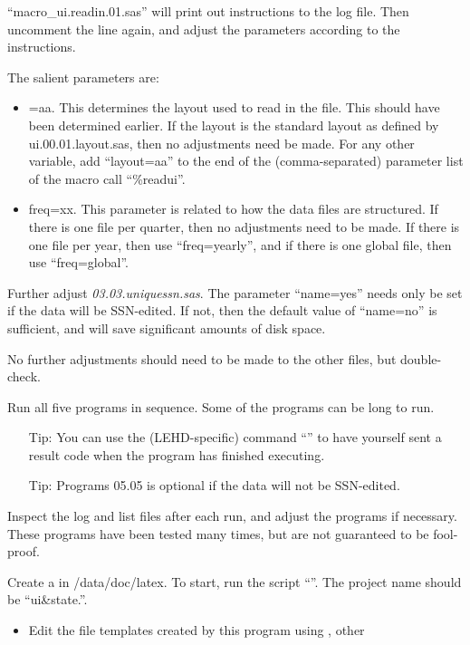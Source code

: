 \begin{description}
\begin{steps}
\begin{itemize}
    ``macro\_ui.readin.01.sas'' will print out instructions to the log
    file. Then uncomment the line again, and adjust the parameters
    according to the instructions.
\end{itemize}
The salient parameters are:
  \begin{itemize}
  \item {}=aa. This determines the layout used to read in the
    file. This should have been determined earlier. If the layout is the
    standard layout as defined by ui.00.01.layout.sas, then no adjustments
    need be made. For any other variable, add ``layout=aa'' to the end of
    the (comma-separated) parameter list of the macro call ``\%readui''.
  \item freq=xx. This parameter is related to how the data files are
    structured. If there is one file per quarter, then no adjustments need
    to be made. If there is one file per year, then use ``freq=yearly'',
    and if there is one global file, then use ``freq=global''.
  \end{itemize}
\item Further adjust \textit{03.03.uniquessn.sas}. The parameter
  ``name=yes'' needs only be set if the data will be SSN-edited. If not,
  then the default value of ``name=no'' is sufficient, and will save
  significant amounts of disk space.
\item No further adjustments should need to be made to the other 
  files, but double-check.
\item Run all five programs in sequence. Some of the programs can be long
  to run. 
  \begin{itemize}
  \item[Tip:] You can use the (LEHD-specific) command ``''
    to have yourself sent a result code when the program has finished
    executing.
  \item[Tip:] Programs 05.05 is optional if the data will not be SSN-edited.
  \end{itemize}
\item Inspect the log and list files after each run, and adjust the
  programs if necessary. These programs have been tested many times, but
  are not guaranteed to be fool-proof.
\item Create a  in /data/doc/latex. To start, run the
  script ``''. The project name should be
  ``ui\&state.''.
  \begin{itemize}
  \item Edit the file templates created by this program using , other

\end{itemize}
\end{steps}
\end{description}
